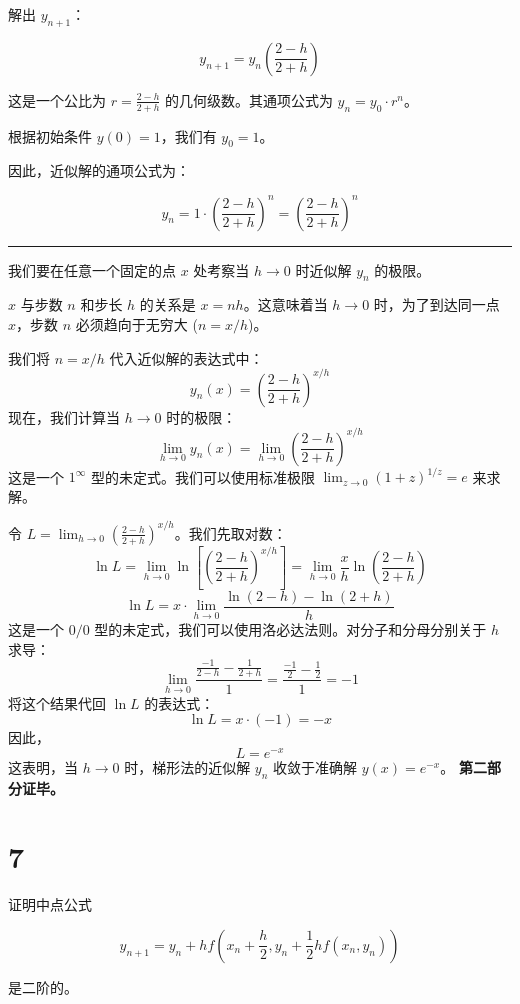 \documentclass[11pt]{article}
\begin{document}
解出 \(y_{n+1}\)：

\[ y_{n+1} = y_n \left( \frac{2 - h}{2 + h} \right) \]

这是一个公比为 \(r = \frac{2-h}{2+h}\) 的几何级数。其通项公式为
\(y_n = y_0 \cdot r^n\)。

根据初始条件 \(y(0) = 1\)，我们有 \(y_0 = 1\)。

因此，近似解的通项公式为：

\[ y_n = 1 \cdot \left( \frac{2 - h}{2 + h} \right)^n = \left( \frac{2 - h}{2 + h} \right)^n \]

\begin{center}\rule{0.5\linewidth}{0.5pt}\end{center}

我们要在任意一个固定的点 \(x\) 处考察当 \(h \to 0\) 时近似解 \(y_n\)
的极限。

\(x\) 与步数 \(n\) 和步长 \(h\) 的关系是 \(x = nh\)。这意味着当
\(h \to 0\) 时，为了到达同一点 \(x\)，步数 \(n\) 必须趋向于无穷大
(\(n = x/h\))。

我们将 \(n = x/h\) 代入近似解的表达式中：
\[ y_n(x) = \left( \frac{2 - h}{2 + h} \right)^{x/h} \] 现在，我们计算当
\(h \to 0\) 时的极限：
\[ \lim_{h \to 0} y_n(x) = \lim_{h \to 0} \left( \frac{2 - h}{2 + h} \right)^{x/h} \]
这是一个 \(1^\infty\) 型的未定式。我们可以使用标准极限
\(\lim_{z \to 0} (1+z)^{1/z} = e\) 来求解。

令
\(L = \lim_{h \to 0} \left( \frac{2 - h}{2 + h} \right)^{x/h}\)。我们先取对数：
\[ \ln L = \lim_{h \to 0} \ln \left[ \left( \frac{2 - h}{2 + h} \right)^{x/h} \right] = \lim_{h \to 0} \frac{x}{h} \ln \left( \frac{2 - h}{2 + h} \right) \]
\[ \ln L = x \cdot \lim_{h \to 0} \frac{\ln(2 - h) - \ln(2 + h)}{h} \]
这是一个 \(0/0\)
型的未定式，我们可以使用洛必达法则。对分子和分母分别关于 \(h\) 求导：
\[ \lim_{h \to 0} \frac{\frac{-1}{2-h} - \frac{1}{2+h}}{1} = \frac{\frac{-1}{2} - \frac{1}{2}}{1} = -1 \]
将这个结果代回 \(\ln L\) 的表达式： \[ \ln L = x \cdot (-1) = -x \]
因此， \[ L = e^{-x} \] 这表明，当 \(h \to 0\) 时，梯形法的近似解
\(y_n\) 收敛于准确解 \(y(x) = e^{-x}\)。 \textbf{第二部分证毕。}

    \section{7}\label{section}

证明中点公式

\[
y_{n + 1} = y_n + hf(x_n + \frac{h}{2}, y_n + \frac{1}{2}hf(x_n, y_n))
\]

是二阶的。
\end{document}
